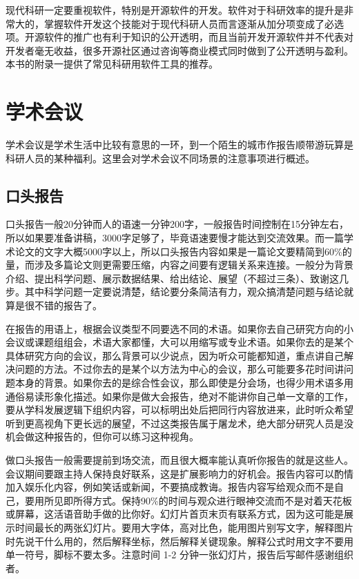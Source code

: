 \documentclass[]{tufte-book}
\begin{document}
现代科研一定要重视软件，特别是开源软件的开发。软件对于科研效率的提升是非常大的，掌握软件开发这个技能对于现代科研人员而言逐渐从加分项变成了必选项。开源软件的推广也有利于知识的公开透明，而且当前开发开源软件并不代表对开发者毫无收益，很多开源社区通过咨询等商业模式同时做到了公开透明与盈利。本书的附录一提供了常见科研用软件工具的推荐。

\hypertarget{ux5b66ux672fux4f1aux8bae}{%
\section{学术会议}\label{ux5b66ux672fux4f1aux8bae}}

学术会议是学术生活中比较有意思的一环，到一个陌生的城市作报告顺带游玩算是科研人员的某种福利。这里会对学术会议不同场景的注意事项进行概述。

\hypertarget{ux53e3ux5934ux62a5ux544a}{%
\subsection{口头报告}\label{ux53e3ux5934ux62a5ux544a}}

口头报告一般20分钟而人的语速一分钟200字，一般报告时间控制在15分钟左右，所以如果要准备讲稿，3000字足够了，毕竟语速要慢才能达到交流效果。而一篇学术论文的文字大概5000字以上，所以口头报告内容如果是一篇论文要精简到60\%的量，而涉及多篇论文则更需要压缩，内容之间要有逻辑关系来连接。一般分为背景介绍、提出科学问题、展示数据结果、给出结论、展望（不超过三条）、致谢这几步。其中科学问题一定要说清楚，结论要分条简洁有力，观众搞清楚问题与结论就算是很不错的报告了。

在报告的用语上，根据会议类型不同要选不同的术语。如果你去自己研究方向的小会议或课题组组会，术语大家都懂，大可以用缩写或专业术语。如果你去的是某个具体研究方向的会议，那么背景可以少说点，因为听众可能都知道，重点讲自己解决问题的方法。不过你去的是某个以方法为中心的会议，那么可能要多花时间讲问题本身的背景。如果你去的是综合性会议，那么即使是分会场，也得少用术语多用通俗易读形象化描述。如果你是做大会报告，绝对不能讲你自己单一文章的工作，要从学科发展逻辑下组织内容，可以标明出处后把同行内容放进来，此时听众希望听到更高视角下更长远的展望，不过这类报告属于屠龙术，绝大部分研究人员是没机会做这种报告的，但你可以练习这种视角。

做口头报告一般需要提前到场交流，而且很大概率能认真听你报告的就是这些人。会议期间要跟主持人保持良好联系，这是扩展影响力的好机会。报告内容可以酌情加入娱乐化内容，例如笑话或新闻，不要搞成教诲。报告内容写给观众而不是自己，要用所见即所得方式。保持90\%的时间与观众进行眼神交流而不是对着天花板或屏幕，这活语音助手做的比你好。幻灯片首页末页有联系方式，因为这可能是展示时间最长的两张幻灯片。要用大字体，高对比色，能用图片别写文字，解释图片时先说干什么用的，然后解释坐标，然后解释关键现象。解释公式时用文字不要用单一符号，脚标不要太多。注意时间 1-2 分钟一张幻灯片，报告后写邮件感谢组织者。
\end{document}
